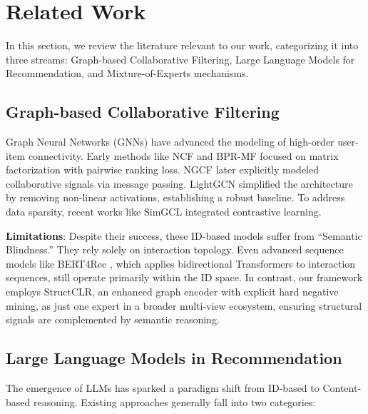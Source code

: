 \section{Related Work}
\label{sec:related_work}

In this section, we review the literature relevant to our work, categorizing it into three streams: Graph-based Collaborative Filtering, Large Language Models for Recommendation, and Mixture-of-Experts mechanisms.

\subsection{Graph-based Collaborative Filtering}
Graph Neural Networks (GNNs) have advanced the modeling of high-order user-item connectivity. Early methods like NCF and BPR-MF \cite{rendle2009bpr} focused on matrix factorization with pairwise ranking loss. NGCF \cite{wang2019neural} later explicitly modeled collaborative signals via message passing. LightGCN \cite{he2020lightgcn} simplified the architecture by removing non-linear activations, establishing a robust baseline. To address data sparsity, recent works like SimGCL \cite{yu2022simples} integrated contrastive learning.

\textbf{Limitations}: Despite their success, these ID-based models suffer from ``Semantic Blindness.'' They rely solely on interaction topology. Even advanced sequence models like BERT4Rec \cite{sun2019bert4rec}, which applies bidirectional Transformers to interaction sequences, still operate primarily within the ID space. In contrast, our framework employs StructCLR, an enhanced graph encoder with explicit hard negative mining, as just one expert in a broader multi-view ecosystem, ensuring structural signals are complemented by semantic reasoning.

\subsection{Large Language Models in Recommendation}
The emergence of LLMs has sparked a paradigm shift from ID-based to Content-based reasoning. Existing approaches generally fall into two categories:

